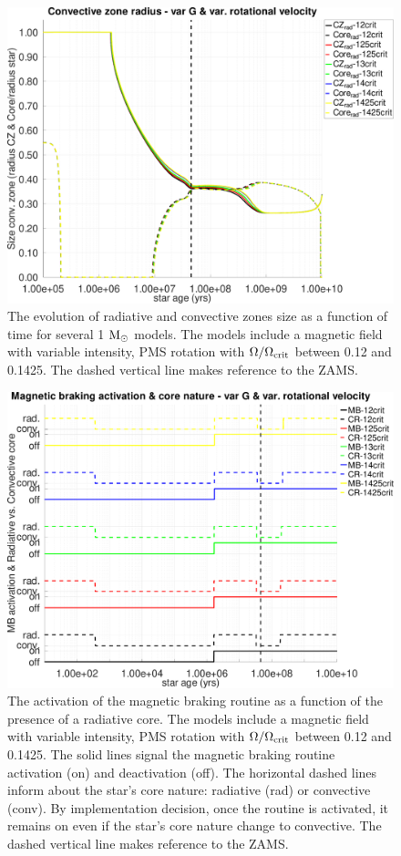 \documentclass[fleqn,usenatbib]{mnras}
\begin{document}
\begin{figure}
	\includegraphics[clip,width=\columnwidth]{figures/paper2/cz_var_vel_var_g3.pdf}
    \caption{The evolution of radiative and convective zones size as a function of time for several 1 $\mathrm{M}_\odot$ models. The models include a magnetic field with variable intensity, PMS rotation with $\Omega / \Omega_{\mathrm{crit}}$ between 0.12 and 0.1425. The dashed vertical line makes reference to the ZAMS.}
    \label{fig:cz_var_vel_var_g3}
\end{figure}

\begin{figure}
	\includegraphics[clip,width=\columnwidth]{figures/paper2/mb_act_var_vel_g3.pdf}
    \caption{The activation of the magnetic braking routine as a function of the presence of a radiative core. The models include a magnetic field with variable intensity, PMS rotation with $\Omega / \Omega_{\mathrm{crit}}$ between 0.12 and 0.1425. The solid lines signal the magnetic braking routine activation (on) and deactivation (off). The horizontal dashed lines inform about the star's core nature: radiative (rad) or convective (conv). By implementation decision, once the routine is activated, it remains on even if the star's core nature change to convective. The dashed vertical line makes reference to the ZAMS.}
    \label{fig:mb_act_var_vel_g3}
\end{figure}
\end{document}
